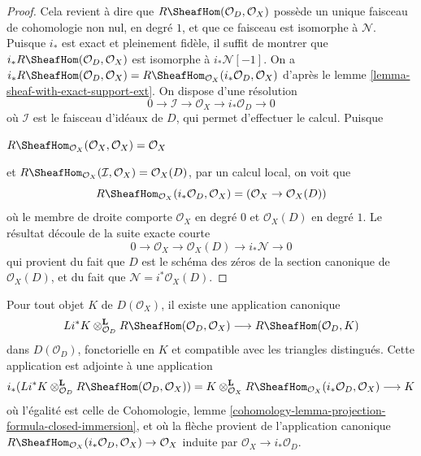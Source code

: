 \begin{proof}
Cela revient à dire que $R\SheafHom(\mathcal{O}_D, \mathcal{O}_X)$ possède un unique faisceau de cohomologie non nul, en degré $1$, et que ce faisceau est isomorphe à $\mathcal{N}$. Puisque $i_*$ est exact et pleinement fidèle, il suffit de montrer que $i_*R\SheafHom(\mathcal{O}_D, \mathcal{O}_X)$ est isomorphe à $i_*\mathcal{N}[-1]$. On a
$i_*R\SheafHom(\mathcal{O}_D, \mathcal{O}_X) =
R\SheafHom_{\mathcal{O}_X}(i_*\mathcal{O}_D, \mathcal{O}_X)$
d'après le lemme \ref{lemma-sheaf-with-exact-support-ext}. On dispose d'une résolution
$$
0 \to \mathcal{I} \to \mathcal{O}_X \to i_*\mathcal{O}_D \to 0
$$
où $\mathcal{I}$ est le faisceau d'idéaux de $D$, qui permet d'effectuer le calcul. Puisque
\par\noindent\hfil
$R\SheafHom_{\mathcal{O}_X}(\mathcal{O}_X, \mathcal{O}_X) = \mathcal{O}_X$
\hfil\par\noindent
et $R\SheafHom_{\mathcal{O}_X}(\mathcal{I}, \mathcal{O}_X) = \mathcal{O}_X(D)$, par un calcul local, on voit que
$$
R\SheafHom_{\mathcal{O}_X}(i_*\mathcal{O}_D, \mathcal{O}_X) =
(\mathcal{O}_X \to \mathcal{O}_X(D))
$$
où le membre de droite comporte $\mathcal{O}_X$ en degré $0$ et $\mathcal{O}_X(D)$ en degré $1$. Le résultat découle de la suite exacte courte
$$
0 \to \mathcal{O}_X \to \mathcal{O}_X(D) \to i_*\mathcal{N} \to 0
$$
qui provient du fait que $D$ est le schéma des zéros de la section canonique de $\mathcal{O}_X(D)$, et du fait que $\mathcal{N} = i^*\mathcal{O}_X(D)$.
\end{proof}

\noindent
Pour tout objet $K$ de $D(\mathcal{O}_X)$, il existe une application canonique
\begin{equation}
\label{equation-map-effective-Cartier}
Li^*K
\otimes_{\mathcal{O}_D}^\mathbf{L}
R\SheafHom(\mathcal{O}_D, \mathcal{O}_X)
\longrightarrow
R\SheafHom(\mathcal{O}_D, K)
\end{equation}
dans $D(\mathcal{O}_D)$, fonctorielle en $K$ et compatible avec les triangles distingués. Cette application est adjointe à une application
$$
i_*(Li^*K \otimes^\mathbf{L}_{\mathcal{O}_D}
R\SheafHom(\mathcal{O}_D, \mathcal{O}_X)) =
K \otimes^\mathbf{L}_{\mathcal{O}_X}
R\SheafHom_{\mathcal{O}_X}(i_*\mathcal{O}_D, \mathcal{O}_X)
\longrightarrow K
$$
où l'égalité est celle de Cohomologie, lemme \ref{cohomology-lemma-projection-formula-closed-immersion}, et où la flèche provient de l'application canonique
$R\SheafHom_{\mathcal{O}_X}(i_*\mathcal{O}_D, \mathcal{O}_X) \to \mathcal{O}_X$
induite par $\mathcal{O}_X \to i_*\mathcal{O}_D$.

